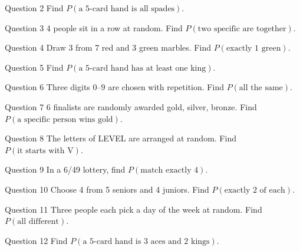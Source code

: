 \documentclass[11pt]{article}
\begin{document}
\begin{qbox}{Question 2}
Find $P(\text{a 5-card hand is all spades})$.\workspace{2.4cm}
\end{qbox}

\begin{qbox}{Question 3}
4 people sit in a row at random. Find $P(\text{two specific are together})$.\workspace{2.4cm}
\end{qbox}

\begin{qbox}{Question 4}
Draw 3 from 7 red and 3 green marbles. Find $P(\text{exactly 1 green})$.\workspace{2.4cm}
\end{qbox}

\begin{qbox}{Question 5}
Find $P(\text{a 5-card hand has at least one king})$.\workspace{2.4cm}
\end{qbox}

\begin{qbox}{Question 6}
Three digits $0$--$9$ are chosen with repetition. Find $P(\text{all the same})$.\workspace{2.4cm}
\end{qbox}

\begin{qbox}{Question 7}
6 finalists are randomly awarded gold, silver, bronze. Find $P(\text{a specific person wins gold})$.\workspace{2.4cm}
\end{qbox}

\begin{qbox}{Question 8}
The letters of LEVEL are arranged at random. Find $P(\text{it starts with V})$.\workspace{2.4cm}
\end{qbox}

\begin{qbox}{Question 9}
In a 6/49 lottery, find $P(\text{match exactly 4})$.\workspace{2.4cm}
\end{qbox}

\begin{qbox}{Question 10}
Choose 4 from 5 seniors and 4 juniors. Find $P(\text{exactly 2 of each})$.\workspace{2.4cm}
\end{qbox}

\begin{qbox}{Question 11}
Three people each pick a day of the week at random. Find $P(\text{all different})$.\workspace{2.4cm}
\end{qbox}

\begin{qbox}{Question 12}
Find $P(\text{a 5-card hand is 3 aces and 2 kings})$.\workspace{2.4cm}
\end{qbox}
\end{document}
